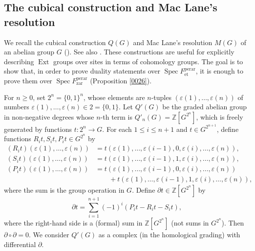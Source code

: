 \documentclass{amsart}
\theoremstyle{remark}
\numberwithin{equation}{subsection}
\newcommand{\compose}{\mathbin{\circ}}
\newcommand{\Z}{\mathbb{Z}}
\newcommand{\et}{\mathrm{et}}
\newcommand{\zar}{\mathrm{zar}}
\newcommand{\perar}{\mathrm{perar}}
\newcommand{\boundary}{\partial}
\DeclareMathOperator{\Ext}{Ext}
\DeclareMathOperator{\Spec}{Spec}
\begin{document}

\subsection{The cubical construction and Mac Lane's resolution}
\label{0154}

We recall the cubical construction $Q(G)$ and Mac Lane's resolution $M(G)$
of an abelian group $G$ (\cite{ML57}).
See also \cite[Section 13.2 and Exercise E.13.2.1]{Lod98}.
These constructions are useful for explicitly describing $\Ext$ groups over sites
in terms of cohomology groups.
The goal is to show that,
in order to prove duality statements over $\Spec F^{\perar}_{\et}$,
it is enough to prove them over $\Spec F^{\perar}_{\zar}$ (Proposition \ref{0026}).

For $n \ge 0$, set $2^{n} = \{0, 1\}^{n}$,
whose elements are $n$-tuples $(\varepsilon(1), \dots, \varepsilon(n))$
of numbers $\varepsilon(1), \dots, \varepsilon(n) \in 2 = \{0, 1\}$.
Let $Q'(G)$ be the graded abelian group in non-negative degrees
whose $n$-th term is $Q'_{n}(G) = \Z[G^{2^{n}}]$,
which is freely generated by functions $t \colon 2^{n} \to G$.
For each $1 \le i \le n + 1$ and $t \in G^{2^{n + 1}}$,
define functions $R_{i} t, S_{i} t, P_{i} t \in G^{2^{n}}$ by
	\begin{align*}
				(R_{i} t)(\varepsilon(1), \dots, \varepsilon(n))
		&	=
				t(\varepsilon(1), \dots, \varepsilon(i - 1), 0, \varepsilon(i), \dots, \varepsilon(n)),
		\\
				(S_{i} t)(\varepsilon(1), \dots, \varepsilon(n))
		&	=
				t(\varepsilon(1), \dots, \varepsilon(i - 1), 1, \varepsilon(i), \dots, \varepsilon(n)),
		\\
				(P_{i} t)(\varepsilon(1), \dots, \varepsilon(n))
		&	=
					t(\varepsilon(1), \dots, \varepsilon(i - 1), 0, \varepsilon(i), \dots, \varepsilon(n))
		\\
		&	\qquad
				+
					t(\varepsilon(1), \dots, \varepsilon(i - 1), 1, \varepsilon(i), \dots, \varepsilon(n)),
	\end{align*}
where the sum is the group operation in $G$.
Define $\boundary t \in \Z[G^{2^{n}}]$ by
	\[
			\boundary t
		=
			\sum_{i = 1}^{n + 1}
				(-1)^{i} (P_{i} t - R_{i} t - S_{i} t),
	\]
where the right-hand side is a (formal) sum in $\Z[G^{2^{n}}]$ (not sums in $G^{2^{n}}$).
Then $\boundary \compose \boundary = 0$.
We consider $Q'(G)$ as a complex (in the homological grading) with differential $\boundary$.
\end{document}
